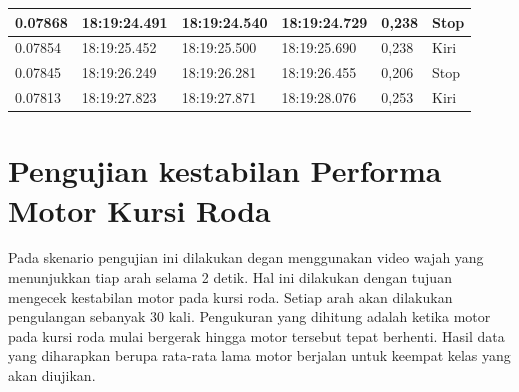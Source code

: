 \begin{longtable}{|l|l|l|l|l|l|}
  0.07868                                                                                                 & 18:19:24.491                                                                                           & 18:19:24.540                                                                                               & 18:19:24.729                                                                                            & 0,238                                              & Stop                                              \\ \hline
  0.07854                                                                                                 & 18:19:25.452                                                                                           & 18:19:25.500                                                                                               & 18:19:25.690                                                                                            & 0,238                                              & Kiri                                              \\ \hline
  0.07845                                                                                                 & 18:19:26.249                                                                                           & 18:19:26.281                                                                                               & 18:19:26.455                                                                                            & 0,206                                              & Stop                                              \\ \hline
  0.07813                                                                                                 & 18:19:27.823                                                                                           & 18:19:27.871                                                                                               & 18:19:28.076                                                                                            & 0,253                                              & Kiri                                              \\ \hline
  \end{longtable}


\section{Pengujian kestabilan Performa Motor Kursi Roda}
Pada skenario pengujian ini dilakukan degan menggunakan video wajah yang menunjukkan tiap arah selama 2 detik. Hal ini dilakukan dengan tujuan mengecek kestabilan motor pada kursi roda. Setiap arah akan dilakukan pengulangan sebanyak 30 kali. Pengukuran yang dihitung adalah ketika motor pada kursi roda mulai bergerak hingga motor tersebut tepat berhenti. Hasil data yang diharapkan berupa rata-rata lama motor berjalan untuk keempat kelas yang akan diujikan.

